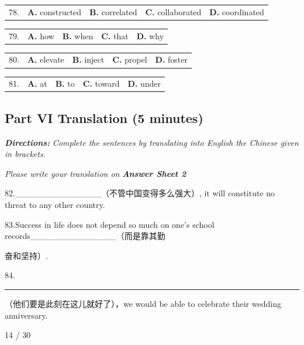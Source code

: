 \documentclass[UTF8,11pt]{ctexart}
\begin{document}
\noindent\begin{tabularx}{\linewidth}{@{}lXXXX@{}}78. & \textbf{A.} constructed & \textbf{B.} correlated & \textbf{C.} collaborated & \textbf{D.} coordinated\\\end{tabularx}\par

\noindent\begin{tabularx}{\linewidth}{@{}lXXXX@{}}79. & \textbf{A.} how & \textbf{B.} when & \textbf{C.} that & \textbf{D.} why\\\end{tabularx}\par

\noindent\begin{tabularx}{\linewidth}{@{}lXXXX@{}}80. & \textbf{A.} elevate & \textbf{B.} inject & \textbf{C.} propel & \textbf{D.} foster\\\end{tabularx}\par

\noindent\begin{tabularx}{\linewidth}{@{}lXXXX@{}}81. & \textbf{A.} at & \textbf{B.} to & \textbf{C.} toward & \textbf{D.} under\\\end{tabularx}\par

\subsection*{\textbf{Part VI} \textbf{Translation (5 minutes)}}


\textbf{\textit{Directions:}}\textit{ Complete the sentences by translating into English the Chinese given in brackets.}


\textit{Please write your translation on}\textbf{\textit{ Answer Sheet 2}}


82.\_\_\_\_\_\_\_\_\_\_\_\_\_\_（不管中国变得多么强大）, it will constitute no threat to any other country.


83.Success in life does not depend so much on one's school records\_\_\_\_\_\_\_\_\_\_\_\_\_\_（而是靠其勤


奋和坚持）.


84. \par\noindent\rule{.95\linewidth}{.4pt}\par （他们要是此刻在这儿就好了），we would be able to celebrate their wedding anniversary.


14 / 30
\end{document}

